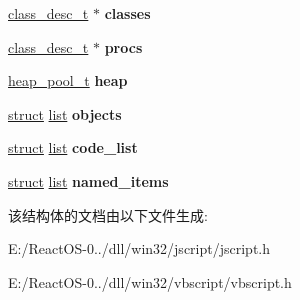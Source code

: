 \begin{DoxyCompactItemize}
\item 
\mbox{\label{struct__script__ctx__t_a3b206122c548e11c228f01e1a97d29d2}} 
\hyperlink{struct__class__desc__t}{class\+\_\+desc\+\_\+t} $\ast$ {\bfseries classes}
\item 
\mbox{\label{struct__script__ctx__t_a74205e91c87b5ac3fc5dcf569fada715}} 
\hyperlink{struct__class__desc__t}{class\+\_\+desc\+\_\+t} $\ast$ {\bfseries procs}
\item 
\mbox{\label{struct__script__ctx__t_a692333bd6b524b3be01cd3178c0d6809}} 
\hyperlink{structheap__pool__t}{heap\+\_\+pool\+\_\+t} {\bfseries heap}
\item 
\mbox{\label{struct__script__ctx__t_a7e9485bc9b2a149bbcad5ff5c53ef153}} 
\hyperlink{interfacestruct}{struct} \hyperlink{classlist}{list} {\bfseries objects}
\item 
\mbox{\label{struct__script__ctx__t_a57e0c6d4480539ab65ee3832c3bda3a6}} 
\hyperlink{interfacestruct}{struct} \hyperlink{classlist}{list} {\bfseries code\+\_\+list}
\item 
\mbox{\label{struct__script__ctx__t_aef9b705b3115f419b5cdb779a0706c88}} 
\hyperlink{interfacestruct}{struct} \hyperlink{classlist}{list} {\bfseries named\+\_\+items}
\end{DoxyCompactItemize}


该结构体的文档由以下文件生成\+:\begin{DoxyCompactItemize}
\item 
E\+:/\+React\+O\+S-\/0../dll/win32/jscript/jscript.\+h\item 
E\+:/\+React\+O\+S-\/0../dll/win32/vbscript/vbscript.\+h\end{DoxyCompactItemize}
